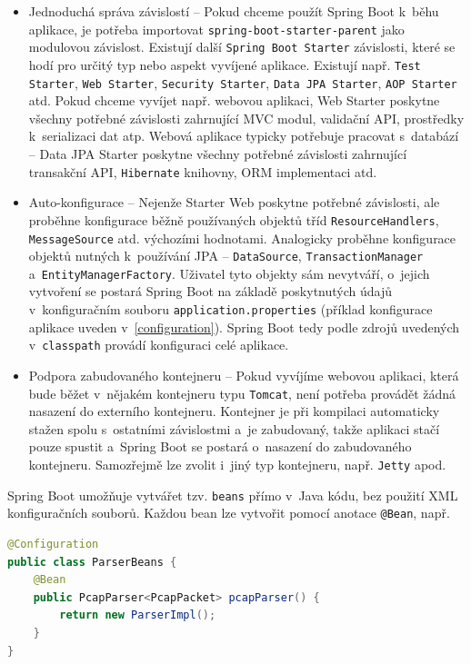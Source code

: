 \begin{itemize}
    \item Jednoduchá správa závislostí -- Pokud chceme použít Spring Boot k~běhu aplikace, je potřeba importovat \texttt{spring-boot-starter-parent} jako modulovou závislost. Existují další \texttt{Spring Boot Starter} závislosti, které se hodí pro určitý typ nebo aspekt vyvíjené aplikace. Existují např. \texttt{Test Starter}, \texttt{Web Starter}, \texttt{Security Starter}, \texttt{Data JPA Starter}, \texttt{AOP Starter} atd. Pokud chceme vyvíjet např. webovou aplikaci, Web Starter poskytne všechny potřebné závislosti zahrnující MVC modul, validační API, prostředky k~serializaci dat atp. Webová aplikace typicky potřebuje pracovat s~databází -- Data JPA Starter poskytne všechny potřebné závislosti zahrnující transakční API, \texttt{Hibernate} knihovny, ORM implementaci atd.
    
    \item Auto-konfigurace -- Nejenže Starter Web poskytne potřebné závislosti, ale proběhne konfigurace běžně používaných objektů tříd \texttt{ResourceHandlers}, \texttt{MessageSource} atd. výchozími hodnotami. Analogicky proběhne konfigurace objektů nutných k~používání JPA -- \texttt{DataSource}, \texttt{TransactionManager} a~\texttt{EntityManagerFactory}. Uživatel tyto objekty sám nevytváří, o~jejich vytvoření se postará Spring Boot na základě poskytnutých údajů v~konfiguračním souboru \texttt{application.properties} (příklad konfigurace aplikace uveden v~\ref{configuration}). Spring Boot tedy podle zdrojů uvedených v~\texttt{classpath} provádí konfiguraci celé aplikace.
    
    \item Podpora zabudovaného kontejneru -- Pokud vyvíjíme webovou aplikaci, která bude běžet v~nějakém kontejneru typu \texttt{Tomcat}, není potřeba provádět žádná nasazení do externího kontejneru. Kontejner je při kompilaci automaticky stažen spolu s~ostatními závislostmi a~je zabudovaný, takže aplikaci stačí pouze spustit a~Spring Boot se postará o~nasazení do zabudovaného kontejneru. Samozřejmě lze zvolit i~jiný typ kontejneru, např. \texttt{Jetty} apod.
\end{itemize}

\noindent Spring Boot umožňuje vytvářet tzv. \texttt{beans} přímo v~Java kódu, bez použití XML konfiguračních souborů. Každou bean lze vytvořit pomocí anotace \texttt{@Bean}, např.

\begin{lstlisting}[language=Java,frame=tb,basicstyle={\small\ttfamily}]
@Configuration
public class ParserBeans {
    @Bean
    public PcapParser<PcapPacket> pcapParser() {
        return new ParserImpl();
    }
}
\end{lstlisting}

